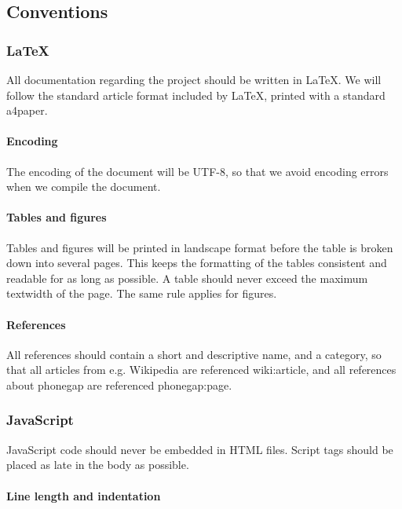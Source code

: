 \subsection{Conventions}

\subsubsection{LaTeX}
All documentation regarding the project should be written in LaTeX. We will
follow the standard article format included by LaTeX, printed with a standard
a4paper.

\paragraph{Encoding}
The encoding of the document will be UTF-8, so that we avoid encoding errors
when we compile the document.

\paragraph{Tables and figures}
Tables and figures will be printed in landscape format before the table is
broken down into several pages.
This keeps the formatting of the tables consistent and readable for as long as
possible. A table should never exceed the maximum textwidth of the page. The
same rule applies for figures.

\paragraph{References}
All references should contain a short and descriptive name, and a category, so
that all articles from e.g. Wikipedia are referenced wiki:article, and all
references about phonegap are referenced phonegap:page.

\subsubsection{JavaScript}

JavaScript code should never be embedded in HTML files. Script tags should be
placed as late in the body as possible. \cite{crockford:code}

\paragraph{Line length and indentation} \hspace{1mm}


